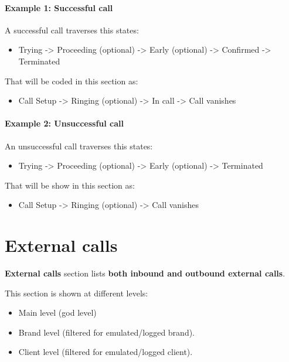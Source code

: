 \documentclass[letterpaper,10pt,english]{sphinxmanual}
\begin{document}
\paragraph{Example 1: Successful call}

A successful call traverses this states:
\begin{itemize}
\item {} 
Trying -\textgreater{} Proceeding (optional) -\textgreater{} Early (optional) -\textgreater{} Confirmed -\textgreater{} Terminated

\end{itemize}

That will be coded in this section as:
\begin{itemize}
\item {} 
Call Setup -\textgreater{} Ringing (optional) -\textgreater{} In call -\textgreater{} Call vanishes

\end{itemize}
\paragraph{Example 2: Unsuccessful call}

An unsuccessful call traverses this states:
\begin{itemize}
\item {} 
Trying -\textgreater{} Proceeding (optional) -\textgreater{} Early (optional) -\textgreater{} Terminated

\end{itemize}

That will be show in this section as:
\begin{itemize}
\item {} 
Call Setup -\textgreater{} Ringing (optional) -\textgreater{} Call vanishes

\end{itemize}


\section{External calls}
\label{administration_portal/platform/external_calls:id1}\label{administration_portal/platform/external_calls::doc}\label{administration_portal/platform/external_calls:external-calls}
\textbf{External calls} section lists \textbf{both inbound and outbound external calls}.

This section is shown at different levels:
\begin{itemize}
\item {} 
Main level (god level)

\item {} 
Brand level (filtered for emulated/logged brand).

\item {} 
Client level (filtered for emulated/logged client).

\end{itemize}
\end{document}
